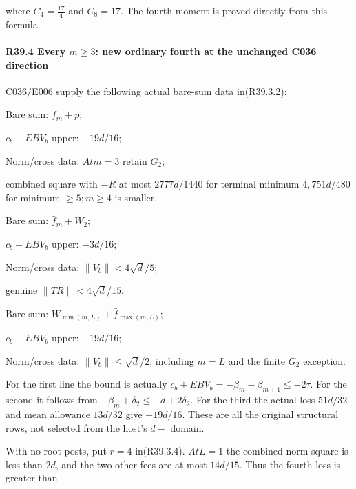 where \(C_{4}=\frac{17}{4}\) and \(C_{8}=17\). The fourth moment is proved directly from this formula.

\paragraph{R39.4 Every \(m\ge 3\): new ordinary fourth at the unchanged C036 direction}\label{part:R39.4}

C036/E006 supply the following actual bare-sum data in(R39.3.2):

\begin{description}[style=nextline,leftmargin=1.6em,before=\raggedright]
\item[{\(L=1\)}] Bare sum: \(\bar f_m+p\);\par\noindent \(c_b+EBV_b\) upper: \(-19d/16\);\par\noindent Norm/cross data: \(At m=3\) retain \(G_{2}\);\par\noindent combined square with \(-R\) at most \(2777d/1440\) for terminal minimum \(4,\allowbreak \allowbreak 751d/480\) for minimum \(\ge 5; m\ge 4\) is smaller.
\item[{\(L=2\)}] Bare sum: \(\bar f_m+W_{2}\);\par\noindent \(c_b+EBV_b\) upper: \(-3d/16\);\par\noindent Norm/cross data: \(\lVert V_b\rVert <4\sqrt{d}/5\);\par\noindent genuine \(\lVert TR\rVert <4\sqrt{d}/15\).
\item[{\(L\ge 3\)}] Bare sum: \(W_{\min(m,\allowbreak \allowbreak L)}+\bar f_{\max(m,\allowbreak \allowbreak L)}\);\par\noindent \(c_b+EBV_b\) upper: \(-19d/16\);\par\noindent Norm/cross data: \(\lVert V_b\rVert \le \sqrt{d}/2\), including \(m=L\) and the finite \(G_{2}\) exception.
\end{description}

For the first line the bound is actually \(c_b+EBV_b=-\beta_m-\beta_{m+1}\le -2\tau\). For the second it follows from \(-\beta_m+\delta_2\le -d+2\delta_2\). For the third the actual loss \(51d/32\) and mean allowance \(13d/32\) give \(-19d/16\). These are all the original structural rows, not selected from the host's \(d-\) domain.

With no root posts, put \(r=4\) in(R39.3.4). \(At L=1\) the combined norm square is less than \(2d\), and the two other fees are at most \(14d/15\). Thus the fourth loss is greater than

